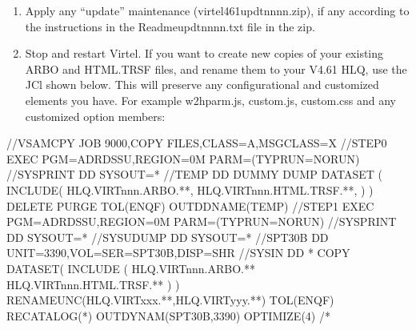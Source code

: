 \documentclass[letterpaper,10pt,english]{sphinxmanual}
\begin{document}
\newpage
\begin{enumerate}
%
\setcounter{enumi}{11}
\item {} 
\sphinxAtStartPar
Apply any “update” maintenance (virtel461updtnnnn.zip), if any according to the instructions in the Readme\sphinxhyphen{}updtnnnn.txt file in the zip.

\item {} 
\sphinxAtStartPar
Stop and restart Virtel. If you want to create new copies of your existing ARBO and HTML.TRSF files, and rename them to your V4.61 HLQ, use the JCl shown below. This will preserve any configurational and customized elements you have. For example w2hparm.js, custom.js, custom.css and any customized option members:\sphinxhyphen{}

\end{enumerate}

\begin{sphinxVerbatim}[commandchars=\\\{\}]
//\PYGZdl{}VSAMCPY JOB 9000,\PYGZsq{}COPY FILES\PYGZsq{},CLASS=A,MSGCLASS=X
//STEP0   EXEC PGM=ADRDSSU,REGION=0M PARM=(\PYGZsq{}TYPRUN=NORUN\PYGZsq{})
//SYSPRINT DD SYSOUT=*
//TEMP DD DUMMY
 DUMP DATASET              \PYGZhy{}
      (                    \PYGZhy{}
       INCLUDE(            \PYGZhy{}
      HLQ.VIRTnnn.ARBO.**, \PYGZhy{}
      HLQ.VIRTnnn.HTML.TRSF.**, \PYGZhy{}
                )         \PYGZhy{}
      )                   \PYGZhy{}
      DELETE    \PYGZhy{}
      PURGE      \PYGZhy{}
      TOL(ENQF) \PYGZhy{}
      OUTDDNAME(TEMP)
//STEP1   EXEC PGM=ADRDSSU,REGION=0M PARM=(\PYGZsq{}TYPRUN=NORUN\PYGZsq{})
//SYSPRINT DD  SYSOUT=*
//SYSUDUMP DD  SYSOUT=*
//SPT30B   DD  UNIT=3390,VOL=SER=SPT30B,DISP=SHR
//SYSIN    DD  *
 COPY                                             \PYGZhy{}
       DATASET(                                   \PYGZhy{}
       INCLUDE (                                  \PYGZhy{}
       HLQ.VIRTnnn.ARBO.**                    \PYGZhy{}
       HLQ.VIRTnnn.HTML.TRSF.**               \PYGZhy{}
  )                                               \PYGZhy{}
  )\PYGZhy{}
  RENAMEUNC(HLQ.VIRTxxx.**,HLQ.VIRTyyy.**) \PYGZhy{}
  TOL(ENQF)   \PYGZhy{}
  RECATALOG(*) \PYGZhy{}
  OUTDYNAM(SPT30B,3390) \PYGZhy{}
  OPTIMIZE(4)
/*
\end{sphinxVerbatim}

\sphinxAtStartPar
{}

\newpage
\end{document}
